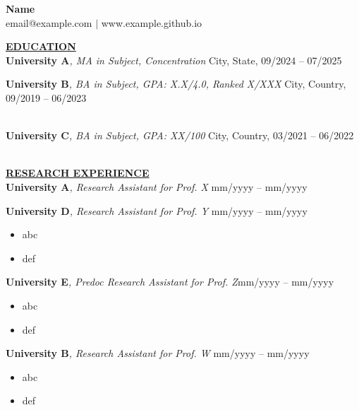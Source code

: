 \documentclass{article}
\begin{document}
\begin{center}
\thispagestyle{empty}
\large \textbf{Name} \\
\normalsize email@example.com $\mid$ www.example.github.io    
\end{center}

\noindent \textbf{\underline{EDUCATION}} \\
\textbf{University A}\textit{, MA in Subject, Concentration} \hfill City, State, 09/2024 -- 07/2025 

\noindent \textbf{University B}\textit{, BA in Subject, GPA: X.X/4.0, Ranked X/XXX} \hfill City, Country, 09/2019 -- 06/2023 \\
\textbullet{}  \\
\textbullet{}  

\noindent \textbf{University C}\textit{, BA in Subject, GPA: XX/100} \hfill City, Country, 03/2021 -- 06/2022 \\
\textbullet{}  \\
\textbullet{}  

\noindent \textbf{\underline{RESEARCH EXPERIENCE}} \\
\noindent \textbf{University A}\textit{, Research Assistant for Prof. X} \hfill mm/yyyy -- mm/yyyy

\noindent \textbf{University D}\textit{, Research Assistant for Prof. Y} \hfill mm/yyyy -- mm/yyyy
\begin{itemize}[noitemsep,nolistsep,leftmargin=*]
\item {abc}
\item {def}
\end{itemize}

\noindent \textbf{University E}\textit{, Predoc Research Assistant for Prof. Z}\hfill mm/yyyy -- mm/yyyy
\begin{itemize}[noitemsep,nolistsep,leftmargin=*]
\item {abc}
\item {def}
\end{itemize}

\noindent \textbf{University B}\textit{, Research Assistant for Prof. W} \hfill mm/yyyy -- mm/yyyy 
\begin{itemize}[noitemsep,nolistsep,leftmargin=*]
\item {abc}
\item {def}
\end{itemize}
\end{document}
